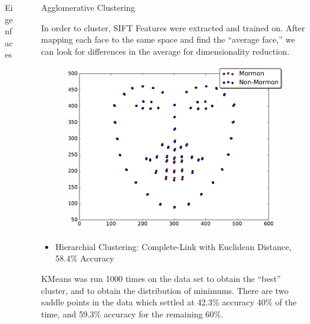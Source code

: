 \documentclass[final]{beamer}
\newlength{\sepwid}
\newlength{\onecolwid}
\begin{document}
\begin{frame}[t]
\begin{columns}[t]
\begin{column}{\onecolwid}
\begin{block}{Eigenfaces}
\end{block}



\end{column} %




\begin{column}{\sepwid}\end{column}

\begin{column}{\onecolwid}

\begin{block}{Agglomerative Clustering}


In order to cluster, SIFT Features were extracted and trained on. After mapping each 
face to the same space and find the ``average face,'' we can look for 
differences in the average for dimensionality reduction.


\begin{figure}
\centering
  \includegraphics[width=.85\linewidth]{../data/average_sift.pdf}
  \label{fig:sift_avg}
\end{figure}

\begin{itemize}
  \item Hierarchial Clustering:
    Complete-Link with Euclidean Distance, 58.4\% Accuracy
\end{itemize}


KMeans was run 1000 times on the data set to obtain the ``best'' cluster, and to obtain the distribution of minimums. 
There are two saddle points in the data which settled at 42.3\% accuracy 40\% of the time,
and 59.3\% accuracy for the remaining 60\%. 


\end{block}
\end{column}
\end{columns}
\end{frame}
\end{document}
